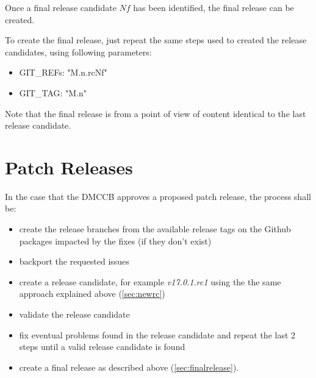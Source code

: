 Once a final release candidate $Nf$ has been identified, the final release can be created.

To create the final release, just repeat the same steps used to created the release candidates, using following parameters:

\begin{itemize}
\item GIT\_REFs: "M.n.rcNf"
\item GIT\_TAG: "M.n"
\end{itemize}

Note that the final release is from a point of view of content identical to the last release candidate.

\newpage

\section{Patch Releases} \label{sec:patchreleases}

In the case that the DMCCB approves a proposed patch release, the process shall be:

\begin{itemize}
\item create the release branches from the available release tags on the Github packages impacted by the fixes (if they don't exist)
\item backport the requested issues
\item create a release candidate, for example \textit{v17.0.1.rc1} using the the same approach explained above (\ref{sec:newrc})
\item validate the release candidate
\item fix eventual problems found in the release candidate and repeat the last 2 steps until a valid release candidate is found
\item create a final release as described above (\ref{sec:finalrelease}).
\end{itemize}


